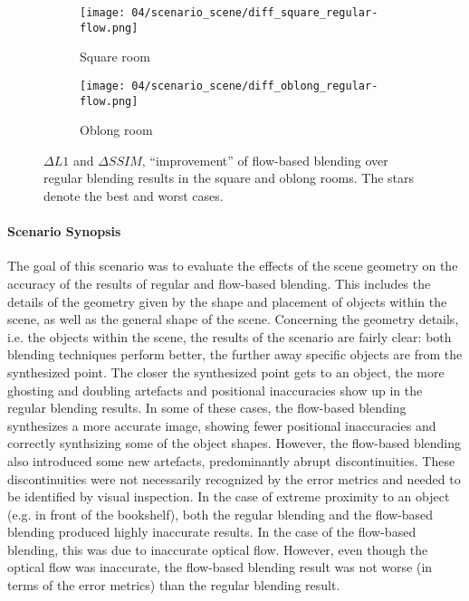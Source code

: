 \begin{figure}
\centering
    \hfill
    \begin{subfigure}[b]{0.45\textwidth}
            \centering
            \texttt{[image: 04/scenario\_scene/diff\_square\_regular-flow.png]}
            \caption{Square room}
    \end{subfigure}
    \hfill
    \begin{subfigure}[b]{0.45\textwidth}
            \centering
            \texttt{[image: 04/scenario\_scene/diff\_oblong\_regular-flow.png]}
            \caption{Oblong room}
    \end{subfigure}
    \hfill
  \caption[Improvement of flow-based blending results over regular blending results in the square and oblong rooms]{$\Delta L1$ and $\Delta SSIM$, ``improvement'' of flow-based blending over regular blending results in the square and oblong rooms. The stars denote the best and worst cases.} \label{fig:scene_diff_square_oblong}
\end{figure}

\paragraph{Scenario Synopsis}
The goal of this scenario was to evaluate the effects of the scene geometry on the accuracy of the results of regular and flow-based blending. This includes the details of the geometry given by the shape and placement of objects within the scene, as well as the general shape of the scene.
Concerning the geometry details, i.e. the objects within the scene, the results of the scenario are fairly clear: both blending techniques perform better, the further away specific objects are from the synthesized point. The closer the synthesized point gets to an object, the more ghosting and doubling artefacts and positional inaccuracies show up in the regular blending results. In some of these cases, the flow-based blending synthesizes a more accurate image, showing fewer positional inaccuracies and correctly synthsizing some of the object shapes. However, the flow-based blending also introduced some new artefacts, predominantly abrupt discontinuities. These discontinuities were not necessarily recognized by the error metrics and needed to be identified by visual inspection. In the case of extreme proximity to an object (e.g. in front of the bookshelf), both the regular blending and the flow-based blending produced highly inaccurate results. In the case of the flow-based blending, this was due to inaccurate optical flow. However, even though the optical flow was inaccurate, the flow-based blending result was not worse (in terms of the error metrics) than the regular blending result.

